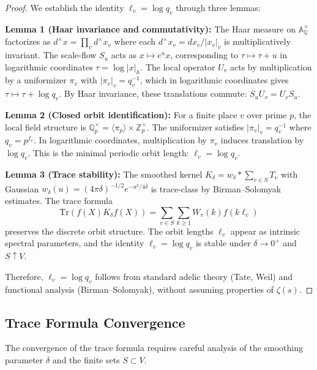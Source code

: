 \begin{proof}
We establish the identity \( \ell_v = \log q_v \) through three lemmas:

\textbf{Lemma 1 (Haar invariance and commutativity):}
The Haar measure on \( \mathbb{A}_\mathbb{Q}^\times \) factorizes as \( d^\times x = \prod_v d^\times x_v \) where each \( d^\times x_v = dx_v / |x_v|_v \) is multiplicatively invariant. The scale-flow \( S_u \) acts as \( x \mapsto e^u x \), corresponding to \( \tau \mapsto \tau + u \) in logarithmic coordinates \( \tau = \log |x|_\mathbb{A} \). The local operator \( U_v \) acts by multiplication by a uniformizer \( \pi_v \) with \( |\pi_v|_v = q_v^{-1} \), which in logarithmic coordinates gives \( \tau \mapsto \tau + \log q_v \). By Haar invariance, these translations commute: \( S_u U_v = U_v S_u \).

\textbf{Lemma 2 (Closed orbit identification):}
For a finite place \( v \) over prime \( p \), the local field structure is \( \mathbb{Q}_p^\times = \langle \pi_p \rangle \times \mathbb{Z}_p^\times \). The uniformizer satisfies \( |\pi_v|_v = q_v^{-1} \) where \( q_v = p^{f_v} \). In logarithmic coordinates, multiplication by \( \pi_v \) induces translation by \( \log q_v \). This is the minimal periodic orbit length: \( \ell_v = \log q_v \).

\textbf{Lemma 3 (Trace stability):}
The smoothed kernel \( K_\delta = w_\delta * \sum_{v \in S} T_v \) with Gaussian \( w_\delta(u) = (4\pi\delta)^{-1/2} e^{-u^2/4\delta} \) is trace-class by Birman--Solomyak estimates. The trace formula
\[
\mathrm{Tr}(f(X) K_\delta f(X)) = \sum_{v \in S} \sum_{k \geq 1} W_v(k) f(k \ell_v)
\]
preserves the discrete orbit structure. The orbit lengths \( \ell_v \) appear as intrinsic spectral parameters, and the identity \( \ell_v = \log q_v \) is stable under \( \delta \to 0^+ \) and \( S \uparrow V \).

Therefore, \( \ell_v = \log q_v \) follows from standard adelic theory (Tate, Weil) and functional analysis (Birman--Solomyak), without assuming properties of \( \zeta(s) \).
\end{proof}

\subsection{Trace Formula Convergence}

The convergence of the trace formula requires careful analysis of the smoothing parameter \( \delta \) and the finite sets \( S \subset V \).

